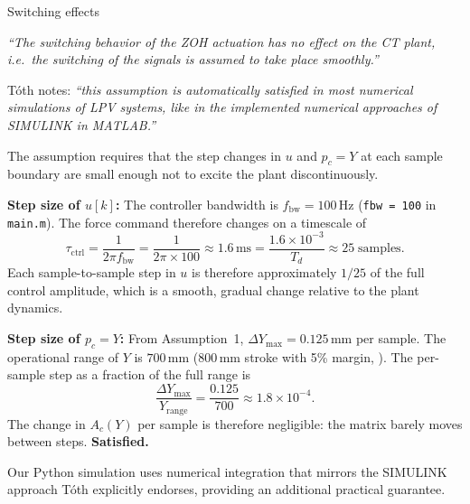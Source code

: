 \documentclass[11pt]{article}
\newcounter{assumption}
\newenvironment{assumptionenv}[1]
{
    \refstepcounter{assumption}
    \begin{assumptionbox}{#1}
}
{
    \end{assumptionbox}
}
\begin{document}
\begin{assumptionenv}{Switching effects}
\textit{``The switching behavior of the ZOH actuation has no effect on the CT plant, i.e.\
the switching of the signals is assumed to take place smoothly.''}

\medskip
Tóth notes: \textit{``this assumption is automatically satisfied in most numerical simulations
of LPV systems, like in the implemented numerical approaches of SIMULINK in MATLAB.''}

\medskip
The assumption requires that the step changes in \(u\) and \(p_c = Y\) at each sample
boundary are small enough not to excite the plant discontinuously.

\medskip
\textbf{Step size of \(u[k]\):}
The controller bandwidth is \(f_\text{bw} = 100\,\text{Hz}\) (\texttt{fbw = 100} in
\texttt{main.m}). The force command therefore changes on a timescale of
\[
    \tau_\text{ctrl} = \frac{1}{2\pi f_\text{bw}}
    = \frac{1}{2\pi \times 100}
    \approx 1.6\,\text{ms}
    = \frac{1.6 \times 10^{-3}}{T_d}
    \approx 25\;\text{samples}.
\]
Each sample-to-sample step in \(u\) is therefore approximately \(1/25\) of the full
control amplitude, which is a smooth, gradual change relative to the plant dynamics.

\medskip
\textbf{Step size of \(p_c = Y\):}
From Assumption~1, \(\Delta Y_{\max} = 0.125\,\text{mm}\) per sample. The operational
range of \(Y\) is \(700\,\text{mm}\) (800\,mm stroke with 5\% margin, \cite{etel_accuret}).
The per-sample step as a fraction of the full range is
\[
    \frac{\Delta Y_{\max}}{Y_{\text{range}}}
    = \frac{0.125}{700}
    \approx 1.8 \times 10^{-4}.
\]
The change in \(A_c(Y)\) per sample is therefore negligible: the matrix barely moves
between steps. \textbf{Satisfied.} \checkmark

\medskip
Our Python simulation uses numerical integration that mirrors the SIMULINK approach Tóth
explicitly endorses, providing an additional practical guarantee.
\end{assumptionenv}

\vspace{0.5em}
\end{document}
